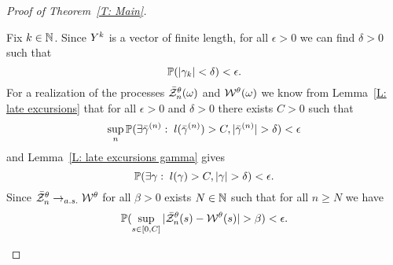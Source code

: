 \begin{proof}[Proof of Theorem~\ref{T: Main}]
\begin{proofpart}
	Fix $k \in \mathbb{N}$. 
	Since ${Y}^k$ is a vector of finite length, for all $\epsilon > 0$ we can find $\delta > 0$ such that
	\begin{equation} \label{E: folk theorem cond bm1}
		\mathbb{P}(|\gamma_k| < \delta) < \epsilon.
	\end{equation}
	For a realization of the processes $\bar{\mathcal{Z}}^{\theta}_n(\omega)$ and $\mathcal{W}^{\theta}(\omega)$ we know from Lemma~\ref{L: late excursions}
	that for all $\epsilon> 0$ and $\delta > 0$ there exists $C > 0$ such that
	\begin{equation} \label{E: folk theorem cond znt}
		\sup_n \mathbb{P}( \exists \bar{\gamma}^{(n)}: \; l(\bar{\gamma}^{(n)}) > C, |\bar{\gamma}^{(n)}| > \delta ) < \epsilon
	\end{equation}
	and Lemma~\ref{L: late excursions gamma} gives
	\begin{equation} \label{E: folk theorem cond bm2}
		\mathbb{P}(\exists \gamma: \; l(\gamma) > C, |\gamma| > \delta) < \epsilon.
	\end{equation}
	Since $\bar{\mathcal{Z}}^{\theta}_n \rightarrow_{a.s.} \mathcal{W}^{\theta}$ for all $\beta > 0$ exists $N \in \mathbb{N}$ such that for all $n \geq N$ we have
	\begin{equation} \label{E: folk theorem cond sup}
		\mathbb{P}( \sup_{s \in [0, C]} |\bar{\mathcal{Z}}^{\theta}_n(s) - \mathcal{W}^{\theta}(s)| > \beta ) < \epsilon.
	\end{equation}
	

\end{proofpart}
\end{proof}
